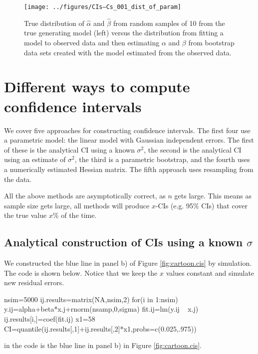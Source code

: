\begin{figure}[htp]\label{fig:distparam}
\begin{center}
\texttt{[image: ../figures/CIs--Cs\_001\_dist\_of\_param]}
\end{center}
\caption{True distribution of $\hat{\alpha}$ and $\hat{\beta}$ from random samples of 10 from the true generating model (left) versus the distribution from fitting a model to observed data and then estimating $\alpha$ and $\beta$ from bootstrap data sets created with the model estimated from the observed data.}
\end{figure}



\section{Different ways to compute confidence intervals}

We cover five approaches for constructing confidence intervals.  The first four use a parametric model: the linear model with Gaussian independent errors.  The first of these is the analytical CI using a known $\sigma^2$, the second is the analytical CI using an estimate of $\sigma^2$, the third is a parametric bootstrap, and the fourth uses a numerically estimated Hessian matrix.  The fifth approach uses resampling from the data. 

All the above methods are asymptotically correct, as $n$ gets large.  This means as sample size gets large, all methods will produce $x$-CIs (e.g. 95\% CIs) that cover the true value $x$\% of the time.  

\subsection{Analytical construction of CIs using a known $\sigma$}

We constructed the blue line in panel b) of Figure \ref{fig:cartoon.cis} by simulation.  The code is shown below.  Notice that we keep the $x$ values constant and simulate new residual errors.
\begin{Schunk}
\begin{Sinput}
 nsim=5000
 ij.results=matrix(NA,nsim,2)
 for(i in 1:nsim){
   y.ij=alpha+beta*x.j+rnorm(nsamp,0,sigma)
   fit.ij=lm(y.ij ~ x.j)
   ij.results[i,]=coef(fit.ij)
 }
 x1=58
 CI=quantile(ij.results[,1]+ij.results[,2]*x1,probs=c(0.025,.975))
\end{Sinput}
\end{Schunk}
\verb@CI@ in the code is the blue line in panel b) in Figure \ref{fig:cartoon.cis}.

